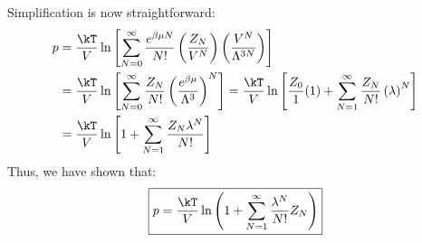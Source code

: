 {Simplification is now straightforward:
\begin{align*}
 p &= \frac{\kT}{V} \ln \left[ \sum_{N=0}^\infty 
      \frac{e^{\beta \mu N}}{N!}
      \left( \frac{Z_N}{V^N} \right)
      \left( \frac{V^N}{\Lambda^{3N}} \right) \right] \\
   &= \frac{\kT}{V} \ln \left[ \sum_{N=0}^\infty \frac{Z_N}{N!} 
      \left( \frac{e^{\beta \mu}}{\Lambda^3} \right)^N
      \right] 
    = \frac{\kT}{V} \ln \left[ 
      \frac{Z_0}{1} (1) +
      \sum_{N=1}^\infty \frac{Z_N}{N!}
      \left( \lambda \right)^N \right] \\
   &= \frac{\kT}{V} \ln \left[ 1 + 
      \sum_{N=1}^{\infty} \frac{ Z_N \lambda^N}{N!} \right]
\end{align*}
Thus, we have shown that:
\[ \boxed{ p = \frac{\kT}{V} \ln \left( 1 + \sum_{N=1}^\infty 
               \frac{\lambda^N}{N!} Z_N \right) } \]
}

